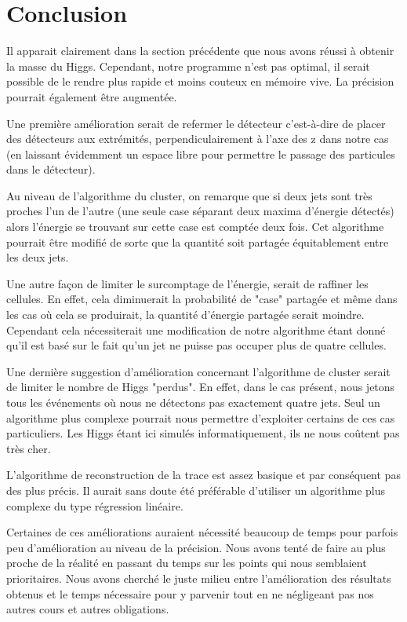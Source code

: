 \documentclass[11pt]{article}
\begin{document}
\newpage
\section{Conclusion}
 Il apparait clairement dans la section pr\'ec\'edente que nous avons r\'eussi \`a obtenir la masse du Higgs.
Cependant, notre programme n'est pas optimal, il serait possible de le rendre plus rapide et 
moins couteux en m\'emoire vive. La pr\'ecision pourrait \'egalement être augment\'ee. 

Une première amélioration serait de refermer le d\'etecteur c'est-à-dire de placer des d\'etecteurs aux extrémités, 
perpendiculairement à l'axe des z dans notre cas (en laissant évidemment un
espace libre pour permettre le passage des 
particules dans le d\'etecteur). 

Au niveau de l'algorithme du cluster, on remarque que si deux jets sont très proches l'un de l'autre (une seule case 
s\'eparant deux maxima d'énergie détectés) alors l'énergie se trouvant sur cette
case est comptée deux fois. Cet algorithme
 pourrait être modifié de sorte que la quantité soit partagée équitablement
entre les deux jets.

Une autre façon de limiter le surcomptage de l'énergie, serait de raffiner les 
cellules. En effet, cela diminuerait la probabilité de "case" partagée et même dans les cas où cela se produirait, la
quantité d'énergie partagée serait moindre. Cependant cela nécessiterait une modification de notre 
algorithme 
étant donné qu'il est basé sur le fait qu'un jet ne puisse pas occuper
plus de quatre cellules.

Une dernière suggestion d'amélioration concernant l'algorithme de cluster serait
de limiter le nombre
de Higgs "perdus". En effet, dans le cas présent, nous jetons tous les
événements où nous ne détectons pas exactement quatre jets. Seul un algorithme
plus complexe pourrait nous permettre d'exploiter certains de ces cas
particuliers. Les Higgs étant ici simulés informatiquement, ils ne nous coûtent
pas très cher.

L'algorithme de reconstruction de la trace est assez basique et par conséquent
pas des plus précis. Il aurait sans doute
été préférable d'utiliser un algorithme plus complexe du type régression linéaire.


Certaines de ces améliorations auraient nécessité beaucoup de temps 
pour parfois peu d'amélioration au niveau de la précision. Nous avons tenté de
faire au plus proche de la réalité en passant du temps sur les points qui nous
semblaient prioritaires. Nous avons cherché le juste milieu entre l'amélioration
des résultats obtenus et le temps nécessaire pour y parvenir tout en ne
négligeant
pas nos autres cours et autres obligations.


		
\end{document}
